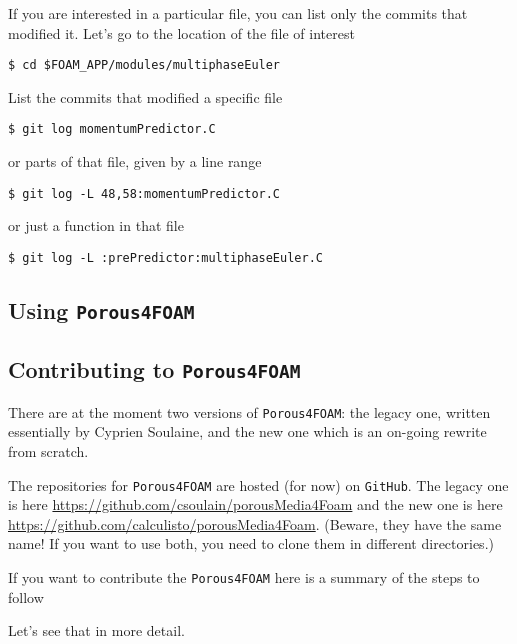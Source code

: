 \documentclass[a4paper]{article}
\newcommand{\PF}{\texttt{Porous4FOAM}\xspace}
\newcommand{\GH}{\texttt{GitHub}\xspace}
\begin{document}
If you are interested in a particular file, you can list only the commits that
modified it. Let's go to the location of the file of interest
\begin{verbatim}
$ cd $FOAM_APP/modules/multiphaseEuler
\end{verbatim}
List the commits that modified a specific file
\begin{verbatim}
$ git log momentumPredictor.C
\end{verbatim}
or parts of that file, given by a line range
\begin{verbatim}
$ git log -L 48,58:momentumPredictor.C
\end{verbatim}
or just a function in that file
\begin{verbatim}
$ git log -L :prePredictor:multiphaseEuler.C
\end{verbatim}

\subsection{Using \PF}

\subsection{Contributing to \PF}

There are at the moment two versions of \PF: the legacy one, written essentially
by Cyprien Soulaine, and the new one which is an on-going rewrite from scratch.

The repositories for \PF are hosted (for now) on \GH. The legacy one is here 
\url{https://github.com/csoulain/porousMedia4Foam} and the new one is here
\url{https://github.com/calculisto/porousMedia4Foam}. (Beware, they have the
same name! If you want to use both, you need to clone them in different
directories.)

If you want to contribute the \PF here is a summary of the steps to follow
Let's see that in more detail.
\end{document}
